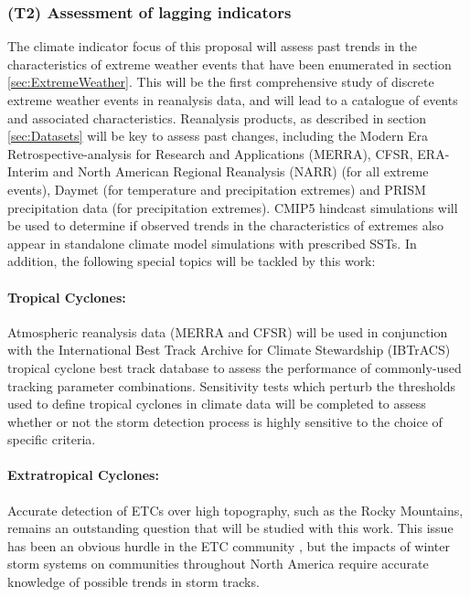 \documentclass[11pt]{article}
\newcommand\citep{\cite}
\begin{document}
\subsubsection{(T2) Assessment of lagging indicators}

The climate indicator focus of this proposal will assess past trends in the characteristics of extreme weather events that have been enumerated in section \ref{sec:ExtremeWeather}.  This will be the first comprehensive study of discrete extreme weather events in reanalysis data, and will lead to a catalogue of events and associated characteristics.  Reanalysis products, as described in section \ref{sec:Datasets} will be key to assess past changes, including the Modern Era Retrospective-analysis for Research and Applications (MERRA), CFSR, ERA-Interim and North American Regional Reanalysis (NARR) (for all extreme events), Daymet (for temperature and precipitation extremes) and PRISM precipitation data (for precipitation extremes).  CMIP5 hindcast simulations will be used to determine if observed trends in the characteristics of extremes also appear in standalone climate model simulations with prescribed SSTs.  In addition, the following special topics will be tackled by this work:

\paragraph{Tropical Cyclones:}  Atmospheric reanalysis data (MERRA and CFSR) will be used in conjunction with the International Best Track Archive for Climate Stewardship (IBTrACS) tropical cyclone best track database \citep{Knapp2010} to assess the performance of commonly-used tracking parameter combinations. Sensitivity tests which perturb the thresholds used to define tropical cyclones in climate data will be completed to assess whether or not the storm detection process is highly sensitive to the choice of specific criteria.

\paragraph{Extratropical Cyclones:}  Accurate detection of ETCs over high topography, such as the Rocky Mountains, remains an outstanding question that will be studied with this work.  This issue has been an obvious hurdle in the ETC community \cite{neu2013imilast}, but the impacts of winter storm systems on communities throughout North America require accurate knowledge of possible trends in storm tracks.
\end{document}
